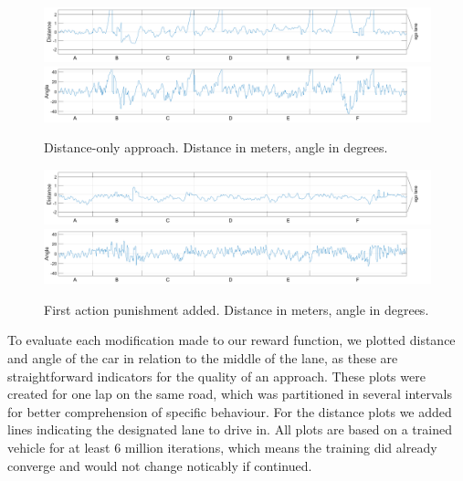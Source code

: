 \begin{figure}[!t]
\centering
\includegraphics[scale=0.265]{../plots/dist_eval_log_distance_serpentine_06speed}
\vspace{0.5em}
\includegraphics[scale=0.265]{../plots/ang_eval_log_distance_serpentine_06speed}
\vspace{-2.25em}
\caption{Distance-only approach. Distance in meters, angle in degrees.}
\label{distance06}
\vspace{1em}
\includegraphics[scale=0.265]{../plots/dist_eval_log_dumb_actions_serpentine_06speed}
\vspace{0.5em}
\includegraphics[scale=0.265]{../plots/ang_eval_log_dumb_actions_serpentine_06speed}
\vspace{-2.25em}\label{fig_first_case}
\caption{First action punishment added. Distance in meters, angle in degrees.}
\label{dumbactions06}
\end{figure}

To evaluate each modification made to our reward function, we plotted distance and angle of the car in relation to the middle of the lane, as these are straightforward indicators for the quality of an approach. These plots were created for one lap on the same road, which was partitioned in several intervals for better comprehension of specific behaviour. For the distance plots we added lines indicating the designated lane to drive in. All plots are based on a trained vehicle for at least 6 million iterations, which means the training did already converge and would not change noticably if continued. 

